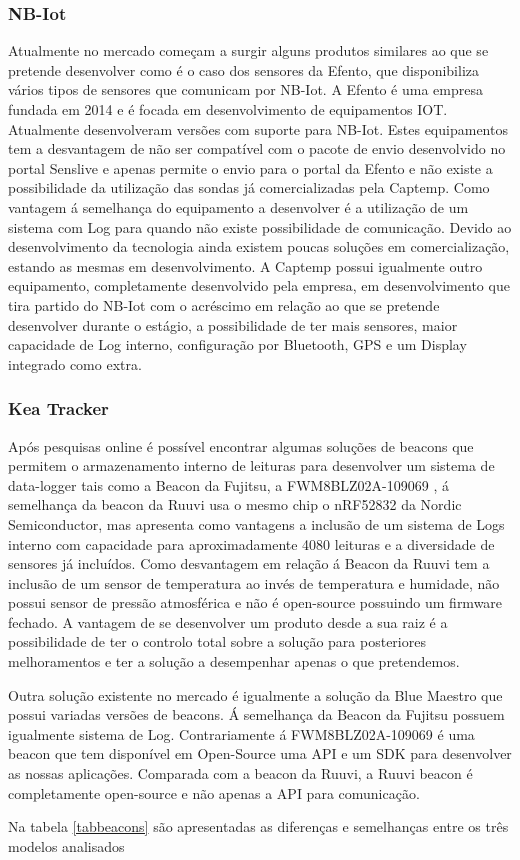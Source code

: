 \subsubsection{NB-Iot}
\par
Atualmente no mercado começam a surgir alguns produtos similares ao que se pretende desenvolver como é o caso dos sensores da Efento\cite{epoka}, que disponibiliza vários tipos de sensores que comunicam por NB-Iot. A Efento é uma empresa fundada em 2014 e é focada em desenvolvimento de equipamentos IOT. Atualmente desenvolveram versões com suporte para NB-Iot. Estes equipamentos tem a desvantagem de não ser compatível com o pacote de envio desenvolvido no portal Senslive e apenas permite o envio para o portal da Efento e não existe a possibilidade da utilização das sondas já comercializadas pela Captemp. Como vantagem á semelhança do equipamento a desenvolver é a utilização de um sistema com Log para quando não existe possibilidade de comunicação.
Devido ao desenvolvimento da tecnologia ainda existem poucas soluções em comercialização, estando as mesmas em desenvolvimento. A Captemp possui igualmente outro equipamento, completamente desenvolvido pela empresa, em desenvolvimento que tira partido do NB-Iot com o acréscimo em relação ao que se pretende desenvolver durante o estágio, a possibilidade de ter mais sensores, maior capacidade de Log interno, configuração por Bluetooth, GPS e um Display integrado como extra.
\subsubsection{Kea Tracker}
Após pesquisas online é possível encontrar algumas soluções de beacons que permitem o armazenamento interno de leituras para desenvolver um sistema de data-logger tais como a Beacon da Fujitsu, a FWM8BLZ02A-109069\cite{beacon1} , á semelhança da beacon da Ruuvi usa o mesmo chip o nRF52832 da Nordic Semiconductor, mas apresenta como vantagens a inclusão de um sistema de Logs interno com capacidade para aproximadamente 4080 leituras e a diversidade de sensores já incluídos. Como desvantagem em relação á Beacon da Ruuvi tem a inclusão de um sensor de temperatura ao invés de temperatura e humidade, não possui sensor de pressão atmosférica e não é open-source possuindo um firmware fechado. A vantagem de se desenvolver um produto desde a sua raiz é a possibilidade de ter o controlo total sobre a solução para posteriores melhoramentos e ter a solução a desempenhar apenas o que pretendemos.
\par
Outra solução existente no mercado é igualmente a solução da Blue Maestro que possui variadas versões de beacons. Á semelhança da Beacon da Fujitsu possuem igualmente sistema de Log. Contrariamente á FWM8BLZ02A-109069 é uma beacon que tem disponível em Open-Source uma API e um SDK para desenvolver as nossas aplicações. Comparada com a beacon da Ruuvi, a Ruuvi beacon é completamente open-source e não apenas a API para comunicação.
\par
Na tabela \ref{tabbeacons} são apresentadas as diferenças e semelhanças entre os três modelos analisados


